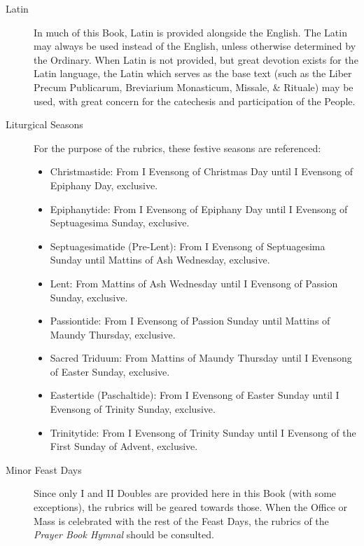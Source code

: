 \begin{description}
\item[Latin] In much of this Book, Latin is provided alongside the English. The Latin may always be used instead of the English, unless otherwise determined by the Ordinary. When Latin is not provided, but great devotion exists for the Latin language, the Latin which serves as the base text (such as the Liber Precum Publicarum, Breviarium Monasticum, Missale, \& Rituale) may be used, with great concern for the catechesis and participation of the People.
\item[Liturgical Seasons] For the purpose of the rubrics, these festive seasons are referenced:
    \begin{itemize}
        \item Christmastide: From I Evensong of Christmas Day until I Evensong of Epiphany Day, exclusive.%
        \item Epiphanytide: From I Evensong of Epiphany Day until I Evensong of Septuagesima Sunday, exclusive.
        \item Septuagesimatide (Pre-Lent): From I Evensong of Septuagesima Sunday until Mattins of Ash Wednesday, exclusive.
        \item Lent: From Mattins of Ash Wednesday until I Evensong of Passion Sunday, exclusive.
        \item Passiontide: From I Evensong of Passion Sunday until Mattins of Maundy Thursday, exclusive.
        \item Sacred Triduum: From Mattins of Maundy Thursday until I Evensong of Easter Sunday, exclusive.
        \item Eastertide (Paschaltide): From I Evensong of Easter Sunday until I Evensong of Trinity Sunday, exclusive.
        \item Trinitytide: From I Evensong of Trinity Sunday until I Evensong of the First Sunday of Advent, exclusive.
    \end{itemize}
\item[Minor Feast Days] Since only I and II Doubles are provided here in this Book (with some exceptions), the rubrics will be geared towards those. When the Office or Mass is celebrated with the rest of the Feast Days, the rubrics of the \emph{Prayer Book Hymnal} should be consulted.%


\end{description}
